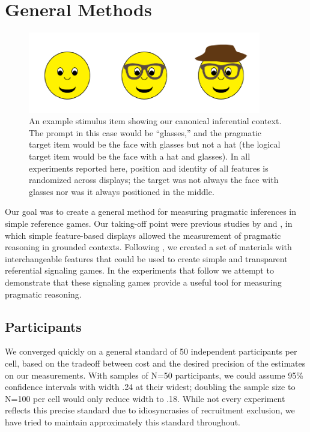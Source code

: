 
\section{General Methods}

\begin{figure}[t]
  \centering
  \includegraphics[width=4in]{figures/hatglasses.pdf}
  \caption{\label{fig:hg} An example stimulus item showing our canonical inferential context. The prompt in this case would be ``glasses,'' and the pragmatic target item would be the face with glasses but not a hat (the logical target item would be the face with a hat and glasses). In all experiments reported here, position and identity of all features is randomized across displays; the target was not always the face with glasses nor was it always positioned in the middle.}
\end{figure}

Our goal was to create a general method for measuring pragmatic inferences in simple reference games. Our taking-off point were previous studies by  and , in which simple feature-based displays allowed the measurement of pragmatic reasoning in grounded contexts. Following , we created a set of materials with interchangeable features that could be used to create simple and transparent referential signaling games. In the experiments that follow we attempt to demonstrate that these signaling games provide a useful tool for measuring pragmatic reasoning. 


\subsection{Participants}

We converged quickly on a general standard of 50 independent participants per cell, based on the tradeoff between cost and the desired precision of the estimates on our measurements. With samples of N=50 participants, we could assume 95\% confidence intervals with width .24 at their widest; doubling the sample size to N=100 per cell would only reduce width to .18. While not every experiment reflects this precise standard due to idiosyncrasies of recruitment exclusion, we have tried to maintain approximately this standard throughout. 

